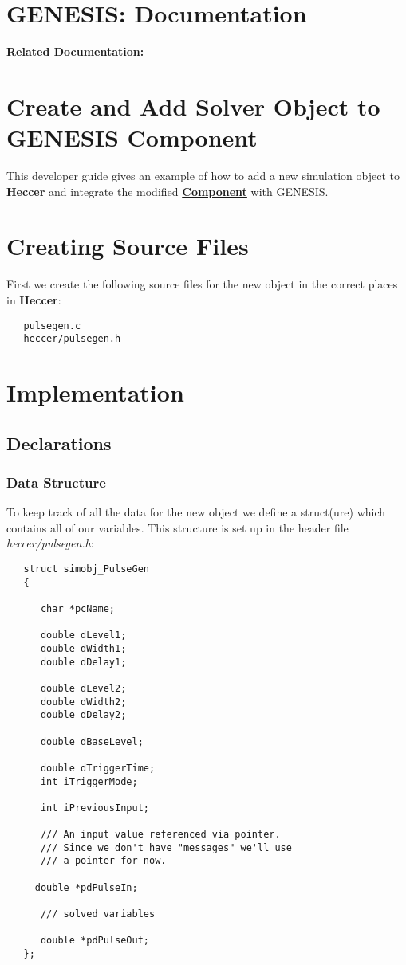 \documentclass[12pt]{article}
\begin{document}
\section*{GENESIS: Documentation}

{\bf Related Documentation:}

\section*{Create and Add Solver Object to GENESIS Component}

This developer guide gives an example of how to add a new simulation object to {\bf Heccer} and integrate the modified \href{../reserved-words/reserved-words.tex}{\bf Component} with GENESIS.

\section*{Creating Source Files}

First we create the following source files for the new object in the correct places in {\bf Heccer}:
\begin{verbatim}
   pulsegen.c
   heccer/pulsegen.h
\end{verbatim}

\section*{Implementation}

\subsection*{Declarations}

\subsubsection*{Data Structure}

To keep track of all the data for the new object we define a struct(ure) which contains all of our variables. This structure is set up in the header file {\it heccer/pulsegen.h}:
\begin{verbatim}
   struct simobj_PulseGen
   {
   
      char *pcName;

      double dLevel1;
      double dWidth1;
      double dDelay1;

      double dLevel2;
      double dWidth2;
      double dDelay2;

      double dBaseLevel;

      double dTriggerTime;
      int iTriggerMode;
  
      int iPreviousInput;

      /// An input value referenced via pointer. 
      /// Since we don't have "messages" we'll use 
      /// a pointer for now.
  
     double *pdPulseIn;

      /// solved variables

      double *pdPulseOut;
   };
\end{verbatim}
\end{document}
